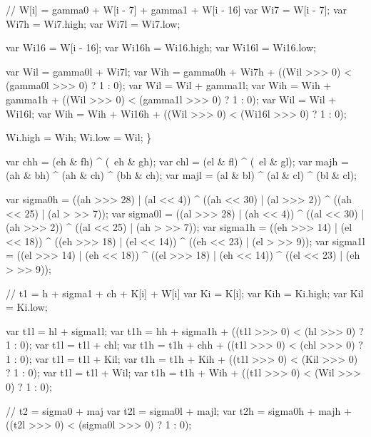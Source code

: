 \begin{DoxyCodeInclude}
                    \textcolor{comment}{// W[i] = gamma0 + W[i - 7] + gamma1 + W[i - 16]}
                    var Wi7  = W[i - 7];
                    var Wi7h = Wi7.high;
                    var Wi7l = Wi7.low;

                    var Wi16  = W[i - 16];
                    var Wi16h = Wi16.high;
                    var Wi16l = Wi16.low;

                    var Wil = gamma0l + Wi7l;
                    var Wih = gamma0h + Wi7h + ((Wil >>> 0) < (gamma0l >>> 0) ? 1 : 0);
                    var Wil = Wil + gamma1l;
                    var Wih = Wih + gamma1h + ((Wil >>> 0) < (gamma1l >>> 0) ? 1 : 0);
                    var Wil = Wil + Wi16l;
                    var Wih = Wih + Wi16h + ((Wil >>> 0) < (Wi16l >>> 0) ? 1 : 0);

                    Wi.high = Wih;
                    Wi.low  = Wil;
                \}

                var chh  = (eh & fh) ^ (~eh & gh);
                var chl  = (el & fl) ^ (~el & gl);
                var majh = (ah & bh) ^ (ah & ch) ^ (bh & ch);
                var majl = (al & bl) ^ (al & cl) ^ (bl & cl);

                var sigma0h = ((ah >>> 28) | (al << 4))  ^ ((ah << 30)  | (al >>> 2)) ^ ((ah << 25) | (al >
      >> 7));
                var sigma0l = ((al >>> 28) | (ah << 4))  ^ ((al << 30)  | (ah >>> 2)) ^ ((al << 25) | (ah >
      >> 7));
                var sigma1h = ((eh >>> 14) | (el << 18)) ^ ((eh >>> 18) | (el << 14)) ^ ((eh << 23) | (el >
      >> 9));
                var sigma1l = ((el >>> 14) | (eh << 18)) ^ ((el >>> 18) | (eh << 14)) ^ ((el << 23) | (eh >
      >> 9));

                \textcolor{comment}{// t1 = h + sigma1 + ch + K[i] + W[i]}
                var Ki  = K[i];
                var Kih = Ki.high;
                var Kil = Ki.low;

                var t1l = hl + sigma1l;
                var t1h = hh + sigma1h + ((t1l >>> 0) < (hl >>> 0) ? 1 : 0);
                var t1l = t1l + chl;
                var t1h = t1h + chh + ((t1l >>> 0) < (chl >>> 0) ? 1 : 0);
                var t1l = t1l + Kil;
                var t1h = t1h + Kih + ((t1l >>> 0) < (Kil >>> 0) ? 1 : 0);
                var t1l = t1l + Wil;
                var t1h = t1h + Wih + ((t1l >>> 0) < (Wil >>> 0) ? 1 : 0);

                \textcolor{comment}{// t2 = sigma0 + maj}
                var t2l = sigma0l + majl;
                var t2h = sigma0h + majh + ((t2l >>> 0) < (sigma0l >>> 0) ? 1 : 0);


\end{DoxyCodeInclude}
